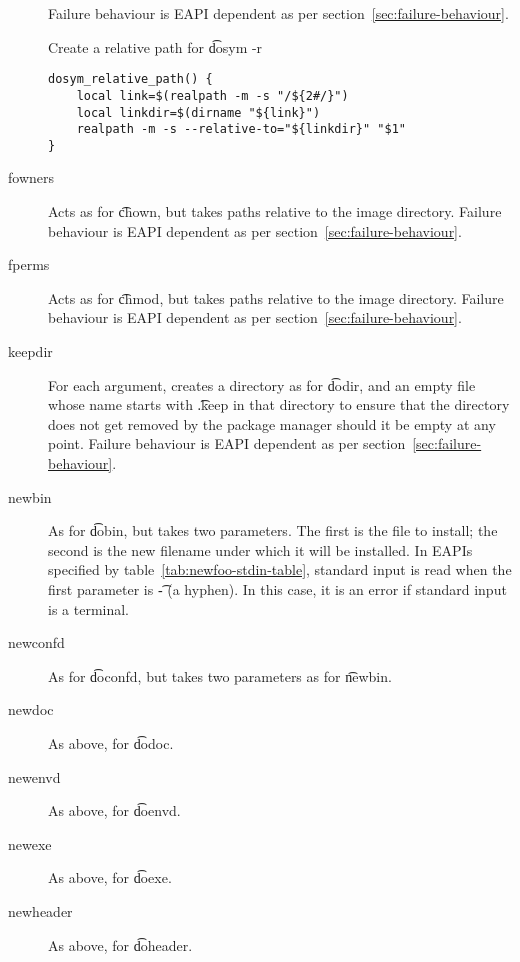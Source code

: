 \begin{description}
    Failure behaviour is EAPI dependent as per section~\ref{sec:failure-behaviour}.

\begin{listing}[h]
\caption{Create a relative path for \t{dosym -r}} \label{lst:dosym-r}
\begin{verbatim}
dosym_relative_path() {
    local link=$(realpath -m -s "/${2#/}")
    local linkdir=$(dirname "${link}")
    realpath -m -s --relative-to="${linkdir}" "$1"
}
\end{verbatim}
\end{listing}

\item[fowners] Acts as for \t{chown}, but takes paths relative to the image directory. Failure
    behaviour is EAPI dependent as per section~\ref{sec:failure-behaviour}.

\item[fperms] Acts as for \t{chmod}, but takes paths relative to the image directory. Failure
    behaviour is EAPI dependent as per section~\ref{sec:failure-behaviour}.

\item[keepdir] For each argument, creates a directory as for \t{dodir}, and an empty file whose
    name starts with \t{.keep} in that directory to ensure that the directory does not get removed
    by the package manager should it be empty at any point. Failure behaviour is EAPI dependent
    as per section~\ref{sec:failure-behaviour}.

\item[newbin]  As for \t{dobin}, but takes two parameters. The first is
    the file to install; the second is the new filename under which it will be installed. In EAPIs
    specified by table~\ref{tab:newfoo-stdin-table}, standard input is read when the first
    parameter is \t{-} (a hyphen). In this case, it is an error if standard input is a terminal.

\item[newconfd] As for \t{doconfd}, but takes two parameters as for \t{newbin}.

\item[newdoc] As above, for \t{dodoc}.

\item[newenvd] As above, for \t{doenvd}.

\item[newexe] As above, for \t{doexe}.

\item[newheader] As above, for \t{doheader}.


\end{description}
